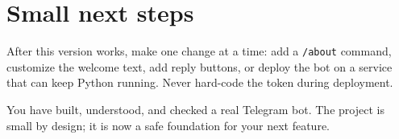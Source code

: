 \section{Small next steps}

After this version works, make one change at a time: add a \texttt{/about}
command, customize the welcome text, add reply buttons, or deploy the bot on a
service that can keep Python running. Never hard-code the token during deployment.

\begin{resultbox}
You have built, understood, and checked a real Telegram bot. The project is small
by design; it is now a safe foundation for your next feature.
\end{resultbox}

